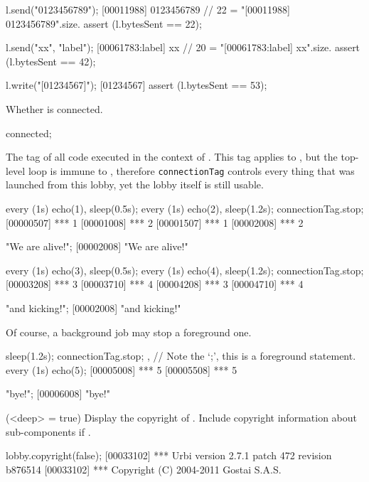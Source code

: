 \begin{urbiscriptapi}
\begin{urbiscript}
l.send("0123456789");
[00011988] 0123456789
// 22 = "[00011988] 0123456789\n".size.
assert (l.bytesSent == 22);

l.send("xx", "label");
[00061783:label] xx
// 20 = "[00061783:label] xx\n".size.
assert (l.bytesSent == 42);

l.write("[01234567]\n");
[01234567]
assert (l.bytesSent == 53);
\end{urbiscript}

\item[connected]
  Whether \this is connected.
\begin{urbiassert}
connected;
\end{urbiassert}

\item[connectionTag] The tag of all code executed in the context of \this.
  This tag applies to \this, but the top-level loop is immune to
  , therefore \lstinline|connectionTag| controls every
  thing that was launched from this lobby, yet the lobby itself is still
  usable.
\begin{urbiscript}
every (1s) echo(1), sleep(0.5s); every (1s) echo(2),
sleep(1.2s);
connectionTag.stop;
[00000507] *** 1
[00001008] *** 2
[00001507] *** 1
[00002008] *** 2

"We are alive!";
[00002008] "We are alive!"

every (1s) echo(3), sleep(0.5s); every (1s) echo(4),
sleep(1.2s);
connectionTag.stop;
[00003208] *** 3
[00003710] *** 4
[00004208] *** 3
[00004710] *** 4

"and kicking!";
[00002008] "and kicking!"
\end{urbiscript}

  Of course, a background job may stop a foreground one.
\begin{urbiscript}
{ sleep(1.2s); connectionTag.stop; },
// Note the `;', this is a foreground statement.
every (1s) echo(5);
[00005008] *** 5
[00005508] *** 5

"bye!";
[00006008] "bye!"
\end{urbiscript}

\item[copyright](<deep> = true)%
  Display the copyright of \usdk.  Include copyright information
  about sub-components if .
\begin{urbiscript}
lobby.copyright(false);
[00033102] *** Urbi version 2.7.1 patch 472 revision b876514
[00033102] *** Copyright (C) 2004-2011 Gostai S.A.S.


\end{urbiscript}
\end{urbiscriptapi}

